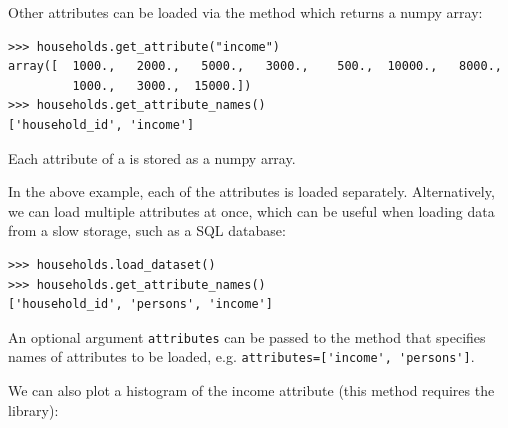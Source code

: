 Other attributes \attributesindex can be loaded via the  \attributesindex method which
returns a numpy array:
\begin{verbatim}
>>> households.get_attribute("income")
array([  1000.,   2000.,   5000.,   3000.,    500.,  10000.,   8000.,
         1000.,   3000.,  15000.])
>>> households.get_attribute_names()
['household_id', 'income']
\end{verbatim}

Each attribute \attributesindex of a  is stored as a numpy array. \numpyindex

In the above example, each of the attributes \attributesindex is
loaded separately. Alternatively, we can load multiple attributes
\attributesindex at once, which can be useful when loading data from
a slow storage, such as a SQL database:
\begin{verbatim}
>>> households.load_dataset()
>>> households.get_attribute_names()
['household_id', 'persons', 'income']
\end{verbatim}
An optional argument \verb|attributes| can be passed to the 
method that specifies names of attributes \attributesindex to be loaded, e.g. \verb|attributes=['income', 'persons']|.



We can also plot a histogram \histogramindex of the income attribute \attributesindex (this method requires the
   \matplotlibindex library):

